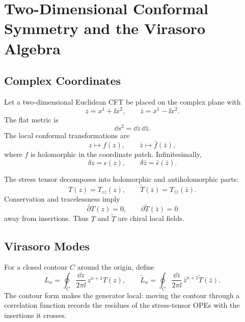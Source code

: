 \chapter{Two-Dimensional Conformal Symmetry and the Virasoro Algebra}
\label{ch:volume-iii-two-dimensional-virasoro}

\section{Complex Coordinates}

Let a two-dimensional Euclidean CFT be placed on the complex plane with
\[
  z=x^1+\ii x^2,
  \qquad
  \bar z=x^1-\ii x^2.
\]
The flat metric is
\[
  \dd s^2=\dd z\,\dd\bar z .
\]
The local conformal transformations are
\[
  z\mapsto f(z),
  \qquad
  \bar z\mapsto \bar f(\bar z),
\]
where \(f\) is holomorphic in the coordinate patch.  Infinitesimally,
\[
  \delta z=\epsilon(z),
  \qquad
  \delta\bar z=\bar\epsilon(\bar z).
\]

The stress tensor decomposes into holomorphic and antiholomorphic parts:
\[
  T(z)=T_{zz}(z),
  \qquad
  \widetilde T(\bar z)=T_{\bar z\bar z}(\bar z).
\]
Conservation and tracelessness imply
\[
  \bar\partial T(z)=0,
  \qquad
  \partial \widetilde T(\bar z)=0
\]
away from insertions.  Thus \(T\) and \(\widetilde T\) are chiral local
fields.

\section{Virasoro Modes}

For a closed contour \(C\) around the origin, define
\begin{equation}
  L_n
  =
  \oint_C\frac{\dd z}{2\pi\ii}\,z^{n+1}T(z),
  \qquad
  \widetilde L_n
  =
  \oint_C\frac{\dd\bar z}{2\pi\ii}\,
  \bar z^{n+1}\widetilde T(\bar z).
  \label{eq:virasoro-mode-definition}
\end{equation}
The contour form makes the generator local: moving the contour through a
correlation function records the residues of the stress-tensor OPEs with the
insertions it crosses.

